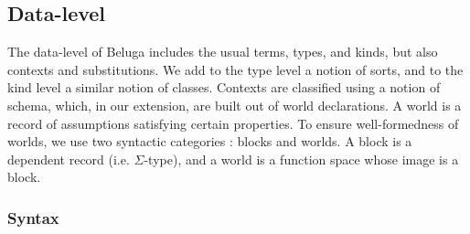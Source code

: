 \documentclass[letterpaper, 11pt]{article}
\begin{document}
    \subsection{Data-level}
    The data-level of Beluga includes the usual terms, types, and kinds, but also contexts and substitutions.  We add to the type level a notion of sorts,
    and to the kind level a similar notion of classes.  Contexts are classified using a notion of schema, which, in our extension, are built out of
    world declarations.  A world is a record of assumptions satisfying certain properties.  To ensure well-formedness of worlds, we use two syntactic
    categories : blocks and worlds.  A block is a dependent record (i.e. $\Sigma$-type), and a world is a function space whose image is a block.

    \subsubsection{Syntax}
\end{document}
